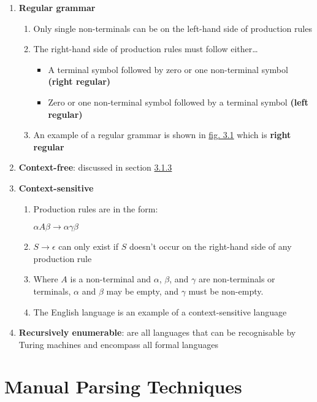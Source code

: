 \begin{enumerate}
    \item \textbf{Regular grammar}
    \begin{enumerate}
        \item Only single non-terminals can be on the left-hand side of production rules
        \item The right-hand side of production rules must follow either\dots
        \begin{itemize}
            \item A terminal symbol followed by zero or one non-terminal symbol \textbf{(right regular)}
            \item Zero or one non-terminal symbol followed by a terminal symbol \textbf{(left regular)}
        \end{itemize}
        \item An example of a regular grammar is shown in \hyperref[fig:3.1]{fig. 3.1} which is \textbf{right regular}
    \end{enumerate}
    \item \textbf{Context-free}: discussed in section \hyperref[sec:features-context-free]{3.1.3}
    \item \textbf{Context-sensitive}
    \begin{enumerate}
        \item Production rules are in the form:
        \begin{center}
            $\alpha A \beta \rightarrow \alpha \gamma \beta$
        \end{center}
        \item $S \rightarrow \epsilon$ can only exist if $S$ doesn't occur on the right-hand side of any production rule
        \item Where $A$ is a non-terminal and $\alpha$, $\beta$, and $\gamma$ are non-terminals or terminals, $\alpha$ and $\beta$ may be empty, and $\gamma$ must be non-empty.
        \item The English language is an example of a context-sensitive language
    \end{enumerate}
    \item \textbf{Recursively enumerable}: are all languages that can be recognisable by Turing machines and encompass all formal languages\textsuperscript{\cite{geuvers_rot_2016}}
\end{enumerate}

\pagebreak

\section{Manual Parsing Techniques}

